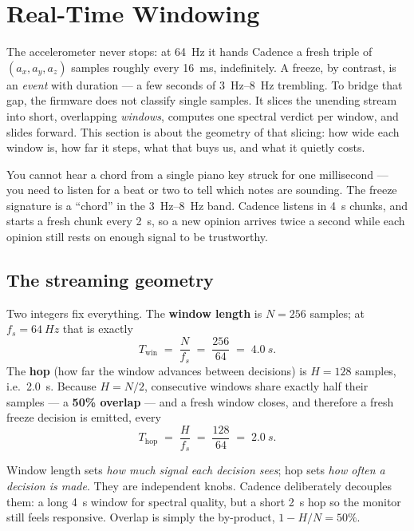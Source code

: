 \section{Real-Time Windowing}
\label{sec:windowing}

The accelerometer never stops: at \SI{64}{Hz} it hands Cadence a fresh triple of
$(a_x,a_y,a_z)$ samples roughly every \SI{16}{ms}, indefinitely. A freeze, by
contrast, is an \emph{event} with duration --- a few seconds of \SIrange{3}{8}{Hz}
trembling. To bridge that gap, the firmware does not classify single samples. It
slices the unending stream into short, overlapping \emph{windows}, computes one
spectral verdict per window, and slides forward. This section is about the geometry
of that slicing: how wide each window is, how far it steps, what that buys us, and
what it quietly costs.

\begin{intuition}
You cannot hear a chord from a single piano key struck for one millisecond --- you
need to listen for a beat or two to tell which notes are sounding. The freeze
signature is a ``chord'' in the \SIrange{3}{8}{Hz} band. Cadence listens in
\SI{4}{s} chunks, and starts a fresh chunk every \SI{2}{s}, so a new opinion arrives
twice a second while each opinion still rests on enough signal to be trustworthy.
\end{intuition}

\subsection{The streaming geometry}

Two integers fix everything. The \textbf{window length} is $N=256$ samples; at
$f_s=\SI{64}{Hz}$ that is exactly
\[
  T_{\text{win}} \;=\; \frac{N}{f_s} \;=\; \frac{256}{64} \;=\; \SI{4.0}{s}.
\]
The \textbf{hop} (how far the window advances between decisions) is $H=128$ samples,
i.e.\ \SI{2.0}{s}. Because $H = N/2$, consecutive windows share exactly half their
samples --- a \textbf{50\% overlap} --- and a fresh window closes, and therefore a
fresh freeze decision is emitted, every
\[
  T_{\text{hop}} \;=\; \frac{H}{f_s} \;=\; \frac{128}{64} \;=\; \SI{2.0}{s}.
\]

\begin{keyidea}
Window length sets \emph{how much signal each decision sees}; hop sets \emph{how
often a decision is made}. They are independent knobs. Cadence deliberately decouples
them: a long \SI{4}{s} window for spectral quality, but a short \SI{2}{s} hop so the
monitor still feels responsive. Overlap is simply the by-product, $1-H/N = 50\%$.
\end{keyidea}

